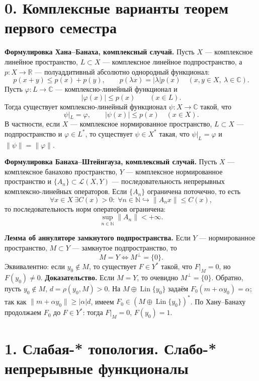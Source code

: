 \documentclass[10pt,a4paper]{article}
\newcommand{\X}{X}
\newcommand{\CC}{\mathbb C}
\newcommand{\R}{\mathbb R}
\newcommand{\Lin}{\operatorname{Lin}}
\begin{document}
	\sloppy

	\section*{0. Комплексные варианты теорем первого семестра}

	\textbf{Формулировка Хана--Банаха, комплексный случай.}
	Пусть $\X$ --- комплексное линейное пространство, $L\subset \X$ --- комплексное линейное подпространство, а $p:\X\to\R$ --- полуаддитивный абсолютно однородный функционал:
	\[
	p(x+y)\le p(x)+p(y),\qquad p(\lambda x)=|\lambda|p(x)
	\quad (x,y\in\X,\ \lambda\in\CC).
	\]
	Пусть $\varphi:L\to\CC$ --- комплексно-линейный функционал и
	\[
	|\varphi(x)|\le p(x)\qquad (x\in L).
	\]
	Тогда существует комплексно-линейный функционал $\psi:\X\to\CC$ такой, что
	\[
	\psi|_L=\varphi,\qquad |\psi(x)|\le p(x)\quad (x\in\X).
	\]
	В частности, если $\X$ --- комплексное нормированное пространство, $L\subset\X$ --- подпространство и $\varphi\in L^\ast$, то существует $\psi\in\X^\ast$ такая, что $\psi|_L=\varphi$ и $\|\psi\|=\|\varphi\|$.

	\textbf{Формулировка Банаха--Штейнгауза, комплексный случай.}
	Пусть $\X$ --- комплексное банахово пространство, $Y$ --- комплексное нормированное пространство и $\{A_n\}\subset\mathcal L(\X,Y)$ --- последовательность непрерывных комплексно-линейных операторов. Если $\{A_n\}$ ограничена поточечно, то есть
	\[
	\forall x\in\X\ \exists C(x)>0:\; \forall n\in\mathbb N
	\hookrightarrow
	\|A_nx\|\le C(x),
	\]
	то последовательность норм операторов ограничена:
	\[
	\sup_{n\in\mathbb N}\|A_n\|<+\infty.
	\]

	\textbf{Лемма об аннуляторе замкнутого подпространства.}
	Если $Y$ --- нормированное пространство, $M\subset Y$ --- замкнутое подпространство, то
	\[
	M=Y \Longleftrightarrow M^\perp=\{0\}.
	\]
	Эквивалентно: если $y_0\notin M$, то существует $F\in Y^\ast$ такой, что $F|_M=0$, но $F(y_0)\ne0$.
	\textbf{Доказательство.}
	Если $M=Y$, то очевидно $M^\perp=\{0\}$. Обратно, пусть $y_0\notin M$, $d=\rho(y_0,M)>0$. На $M\oplus\Lin\{y_0\}$ задаём $F_0(m+\alpha y_0)=\alpha$; так как $\|m+\alpha y_0\|\ge|\alpha|d$, имеем $F_0\in(M\oplus\Lin\{y_0\})^\ast$. По Хану--Банаху продолжаем $F_0$ до $F\in Y^\ast$: тогда $F|_M=0$, $F(y_0)=1$.

	\section*{1. Слабая-* топология. Слабо-* непрерывные функционалы}
\end{document}
